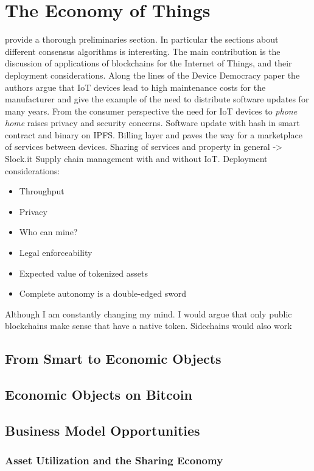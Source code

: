 \chapter{The Economy of Things}
\label{sec:economy}

\cite{Christidis2016} provide a thorough preliminaries section. In particular the sections about different consensus algorithms is interesting. The main contribution is the discussion of applications of blockchains for the Internet of Things, and their deployment considerations. Along the lines of the Device Democracy paper the authors argue that IoT devices lead to high maintenance costs for the manufacturer and give the example of the need to distribute software updates for many years. From the consumer perspective the need for IoT devices to \emph{phone home} raises privacy and security concerns.
Software update with hash in smart contract and binary on IPFS.
Billing layer and paves the way for a marketplace of services between devices.
Sharing of services and property in general -> Slock.it
Supply chain management with and without IoT.
Deployment considerations:
\begin{itemize}
\item Throughput
\item Privacy
\item Who can mine?
\item Legal enforceability
\item Expected value of tokenized assets
\item Complete autonomy is a double-edged sword
\end{itemize}


Although I am constantly changing my mind. I would argue that only public blockchains make sense that have a native token. Sidechains would also work 
\section{From Smart to Economic Objects}

\section{Economic Objects on Bitcoin}

\section{Business Model Opportunities}

\subsection{Asset Utilization and the Sharing Economy}

